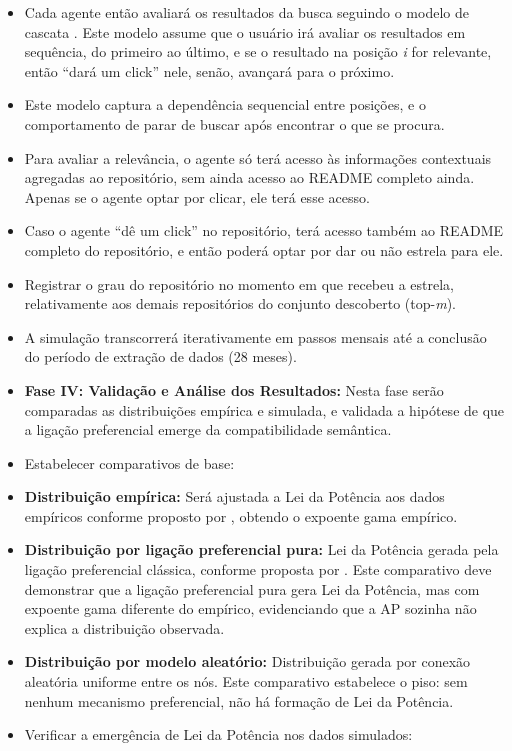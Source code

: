 \documentclass[12pt,oneside,a4paper,brazil,sumario=tradicional]{abntex2}
\begin{document}
\begin{itemize}
  \item Cada agente então avaliará os resultados da busca seguindo o modelo de cascata \cite{craswell2008}. Este modelo assume que o usuário irá avaliar os resultados em sequência, do primeiro ao último, e se o resultado na posição \textit{i} for relevante, então “dará um click” nele, senão, avançará para o próximo.
  \item Este modelo captura a dependência sequencial entre posições, e o comportamento de parar de buscar após encontrar o que se procura.
  \item Para avaliar a relevância, o agente só terá acesso às informações contextuais agregadas ao repositório, sem ainda acesso ao README completo ainda. Apenas se o agente optar por clicar, ele terá esse acesso.
  \item Caso o agente “dê um click” no repositório, terá acesso também ao README completo do repositório, e então poderá optar por dar ou não estrela para ele.
  \item Registrar o grau do repositório no momento em que recebeu a estrela, relativamente aos demais repositórios do conjunto descoberto (top-\textit{m}).
  \item A simulação transcorrerá iterativamente em passos mensais até a conclusão do período de extração de dados (28 meses).
  \item \textbf{Fase IV: Validação e Análise dos Resultados:} Nesta fase serão comparadas as distribuições empírica e simulada, e validada a hipótese de que a ligação preferencial emerge da compatibilidade semântica.
  \item Estabelecer comparativos de base:
  \item \textbf{Distribuição empírica:} Será ajustada a Lei da Potência aos dados empíricos conforme proposto por , obtendo o expoente gama empírico.
  \item \textbf{Distribuição por ligação preferencial pura:} Lei da Potência gerada pela ligação preferencial clássica, conforme proposta por . Este comparativo deve demonstrar que a ligação preferencial pura gera Lei da Potência, mas com expoente gama diferente do empírico, evidenciando que a AP sozinha não explica a distribuição observada.
  \item \textbf{Distribuição por modelo aleatório:} Distribuição gerada por conexão aleatória uniforme entre os nós. Este comparativo estabelece o piso: sem nenhum mecanismo preferencial, não há formação de Lei da Potência.
  \item Verificar a emergência de Lei da Potência nos dados simulados:

\end{itemize}
\end{document}
